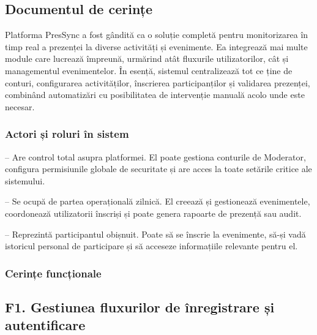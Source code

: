 \documentclass[11pt]{article}
\begin{document}
\subsection{Documentul de cerințe}

Platforma PresSync a fost gândită ca o soluție completă pentru monitorizarea în timp real a prezenței la diverse activități și evenimente. Ea integrează mai multe module care lucrează împreună, urmărind atât fluxurile utilizatorilor, cât și managementul evenimentelor. În esență, sistemul centralizează tot ce ține de conturi, configurarea activităților, înscrierea participanților și validarea prezenței, combinând automatizări cu posibilitatea de intervenție manuală acolo unde este necesar.

\subsubsection{Actori și roluri în sistem}

\begin{description}[leftmargin=1.5cm, style=nextline]
    \item[Admin] – Are control total asupra platformei. El poate gestiona conturile de Moderator, configura permisiunile globale de securitate și are acces la toate setările critice ale sistemului.
    
    \item[Moderator] – Se ocupă de partea operațională zilnică. El creează și gestionează evenimentele, coordonează utilizatorii înscriși și poate genera rapoarte de prezență sau audit.
    
    \item[User] – Reprezintă participantul obișnuit. Poate să se înscrie la evenimente, să-și vadă istoricul personal de participare și să acceseze informațiile relevante pentru el.
\end{description}

\newpage

\subsubsection{Cerințe funcționale}

\subsection*{F1. Gestiunea fluxurilor de înregistrare și autentificare}
\end{document}
